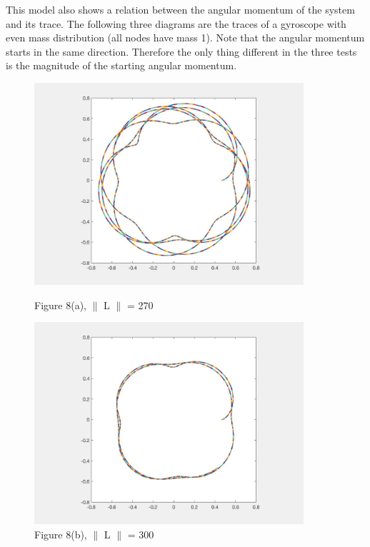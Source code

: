\documentclass[12pt]{article}
\renewcommand{\(}{\left (}
\renewcommand{\)}{\right )}
\begin{document}
This model also shows a relation between the angular momentum of the system and its trace. The following three diagrams are the traces of a gyroscope with even mass distribution (all nodes have mass 1). Note that the angular momentum starts in the same direction. Therefore the only thing different in the three tests is the magnitude of the starting angular momentum.
\begin{figure}[ht]
	\begin{minipage}{0.33\textwidth}
		\centering
		\includegraphics[width=0.89\textwidth]{even_L270.jpg}
		\caption*{\small Figure 8(a), $\parallel$ L $\parallel$ = 270}
	\end{minipage}
	\begin{minipage}{0.33\textwidth}
		\centering
		\includegraphics[width=0.89\textwidth]{even_L300.jpg}
		\caption*{\small Figure 8(b), $\parallel$ L $\parallel$ = 300}
	\end{minipage}

\end{figure}
\end{document}
